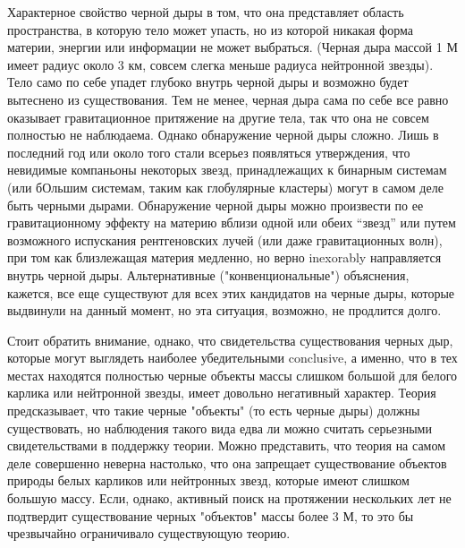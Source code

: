 \documentclass[a4paper, 10pt, twocolumn]{article}
\def\q#1{{\color{red} #1}}
\begin{document}
Характерное свойство черной дыры в том, что она представляет область 
пространства, в которую тело может упасть, но из которой никакая форма 
материи, энергии или информации не может выбраться. (Черная дыра массой 
1 М имеет радиус около 3 км, совсем слегка меньше радиуса нейтронной 
звезды). Тело само по себе упадет глубоко внутрь черной дыры и возможно 
будет вытеснено из существования. Тем не менее, черная дыра  сама по 
себе все равно оказывает гравитационное притяжение на другие тела, так 
что она не совсем полностью не наблюдаема. Однако обнаружение черной 
дыры сложно. Лишь в последний год или около того стали всерьез 
появляться утверждения, что невидимые компаньоны некоторых звезд, 
принадлежащих к бинарным системам (или бОльшим системам, таким как 
глобулярные кластеры) могут в самом деле быть черными дырами. 
Обнаружение черной дыры можно произвести по ее гравитационному эффекту 
на материю вблизи одной или обеих ``звезд'' или путем возможного 
испускания рентгеновских лучей (или даже гравитационных волн), при том 
как близлежащая материя медленно, но верно \q{inexorably} направляется 
внутрь черной дыры. Альтернативные ("конвенциональные") объяснения, 
кажется, все еще существуют для всех этих кандидатов на черные дыры, 
которые выдвинули на данный момент, но эта ситуация, возможно, не 
продлится долго.

Стоит обратить внимание, однако, что свидетельства существования черных 
дыр, которые могут выглядеть наиболее убедительными \q{conclusive}, 
а именно, что в тех местах находятся полностью черные объекты массы 
слишком большой для белого карлика или нейтронной звезды, имеет довольно 
негативный характер. Теория предсказывает, что такие черные "объекты" 
(то есть черные дыры) должны существовать, но наблюдения такого вида 
едва ли можно считать серьезными свидетельствами в поддержку теории. 
Можно представить, что теория на самом деле совершенно неверна 
настолько, что она запрещает существование объектов природы белых 
карликов или нейтронных звезд, которые имеют слишком большую массу. 
Если, однако, активный поиск на протяжении нескольких лет не подтвердит 
существование черных "объектов" массы более 3 М, то это бы чрезвычайно 
ограничивало существующую теорию.
\end{document}
